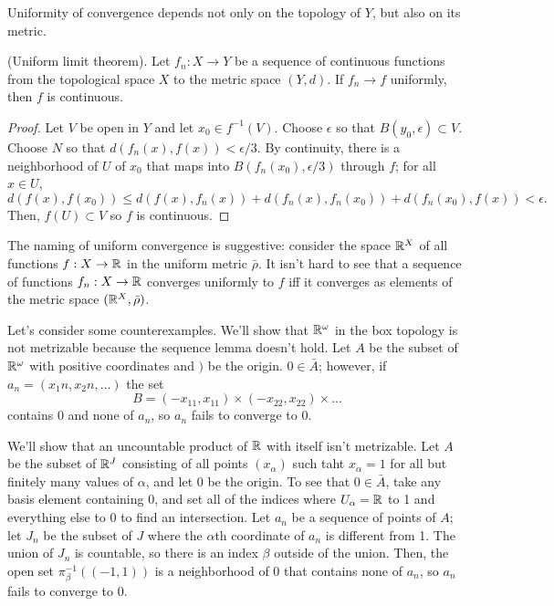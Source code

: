 \documentclass[10pt]{report}
\begin{document}
Uniformity of convergence depends not only on the topology of $Y$, but also on its metric.

\begin{theorem}
  {\normalfont (Uniform limit theorem).}
  Let $f_n:X \rightarrow Y$ be a sequence of continuous functions from the topological space $X$ to the metric space $(Y,d)$.
  If $f_n \rightarrow f$ uniformly, then $f$ is continuous.
\end{theorem}
\begin{proof}
  Let $V$ be open in $Y$ and let $x_0 \in f^{-1}(V)$.
  Choose $\epsilon$ so that $B(y_0,\epsilon) \subset V$.
  Choose $N$ so that $d(f_n(x),f(x)) < \epsilon/3$.
  By continuity, there is a neighborhood of $U$ of $x_0$ that maps into $B(f_n(x_0),\epsilon/3)$ through $f$; for all $x \in U$, 
  \[
    d(f(x),f(x_0)) \leq d(f(x),f_n(x)) + d(f_n(x),f_n(x_0)) + d(f_n(x_0),f(x)) < \epsilon.
  \]
  Then, $f(U) \subset V$ so $f$ is continuous.
\end{proof}

The naming of uniform convergence is suggestive:
consider the space $\mathbb{R}^X$ of all functions $f:X \rightarrow \mathbb{R}$ in the uniform metric $\bar \rho$.
It isn't hard to see that a sequence of functions $f_n:X \rightarrow \mathbb{R}$ converges uniformly to $f$ iff it converges as elements of the metric space $(\mathbb{R}^X,\bar \rho)$.

Let's consider some counterexamples.
We'll show that $\mathbb{R}^\omega$ in the box topology is not metrizable because the sequence lemma doesn't hold.
Let $A$ be the subset of $\mathbb{R}^\omega$ with positive coordinates and $)$ be the origin.
$0 \in \bar A$; however, if $a_n = (x_1n,x_2n,\dots)$ the set
\[
  B = (-x_{11},x_{11}) \times (-x_{22},x_{22}) \times \dots
\]
contains $0$ and none of $a_n$, so $a_n$ fails to converge to $0$.

We'll show that an uncountable product of $\mathbb{R}$ with itself isn't metrizable.
Let $A$ be the subset of $\mathbb{R}^J$ consisting of all points $(x_\alpha)$ such taht $x_\alpha = 1$ for all but finitely many values of $\alpha$, and let $0$ be the origin.
To see that $0 \in \bar A$, take any basis element containing $0$, and set all of the indices where $U_\alpha = \mathbb{R}$ to 1 and everything else to $0$ to find an intersection.
Let $a_n$ be a sequence of points of $A$; let $J_n$ be the subset of $J$ where the $\alpha$th coordinate of $a_n$ is different from 1.
The union of $J_n$ is countable, so there is an index $\beta$ outside of the union.
Then, the open set $\pi_\beta^{-1}((-1,1))$ is a neighborhood of 0 that contains none of $a_n$, so $a_n$ fails to converge to 0.
\end{document}
